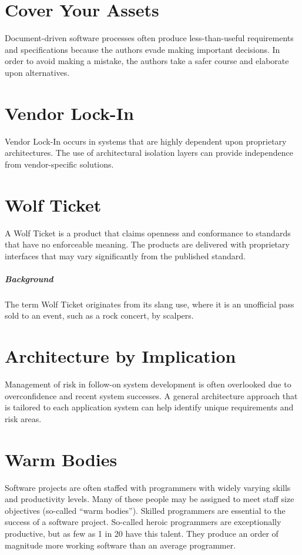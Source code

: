 \documentclass{book}
\begin{document}
\chapter{Cover Your Assets}
Document-driven software processes often produce less-than-useful requirements and specifications because the authors evade making important decisions.
In order to avoid making a mistake, the authors take a safer course and elaborate upon alternatives.
\chapter{Vendor Lock-In}
Vendor Lock-In occurs in systems that are highly dependent upon proprietary architectures.
The use of architectural isolation layers can provide independence from vendor-specific solutions.
\chapter{Wolf Ticket}
A Wolf Ticket is a product that claims openness and conformance to standards that have no enforceable meaning.
The products are delivered with proprietary interfaces that may vary significantly from the published standard.
\paragraph{Background}
The term Wolf Ticket originates from its slang use, where it is an unofficial pass sold to an event, such as a rock concert, by scalpers.
\chapter{Architecture by Implication}
Management of risk in follow-on system development is often overlooked due to overconfidence and recent system successes.
A general architecture approach that is tailored to each application system can help identify unique requirements and risk areas.
\chapter{Warm Bodies}
Software projects are often staffed with programmers with widely varying skills and productivity levels.
Many of these people may be assigned to meet staff size objectives (so-called “warm bodies”).
Skilled programmers are essential to the success of a software project.
So-called heroic programmers are exceptionally productive, but as few as 1 in 20 have this talent. They produce an order of magnitude more working software than an average programmer.
\end{document}

